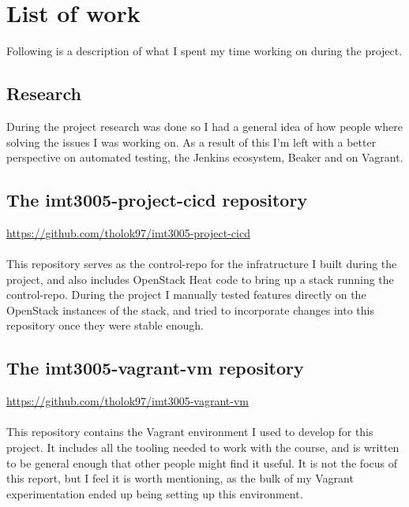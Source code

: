 
\section{List of work} \label{listofwork}

Following is a description of what I spent my time working on during the project.

\subsection{Research}

During the project research was done so I had a general idea of how people where solving the issues I was working on. As a result of this I'm left with a better perspective on automated testing, the Jenkins ecosystem, Beaker and on Vagrant.

\subsection{The imt3005-project-cicd repository}

\url{https://github.com/tholok97/imt3005-project-cicd}
\\
\\
This repository serves as the control-repo for the infratructure I built during the project, and also includes OpenStack Heat code to bring up a stack running the control-repo. During the project I manually tested features directly on the OpenStack instances of the stack, and tried to incorporate changes into this repository once they were stable enough.

\subsection{The imt3005-vagrant-vm repository}

\url{https://github.com/tholok97/imt3005-vagrant-vm}
\\
\\
This repository contains the Vagrant environment I used to develop for this project. It includes all the tooling needed to work with the course, and is written to be general enough that other people might find it useful. It is not the focus of this report, but I feel it is worth mentioning, as the bulk of my Vagrant experimentation ended up being setting up this environment.

